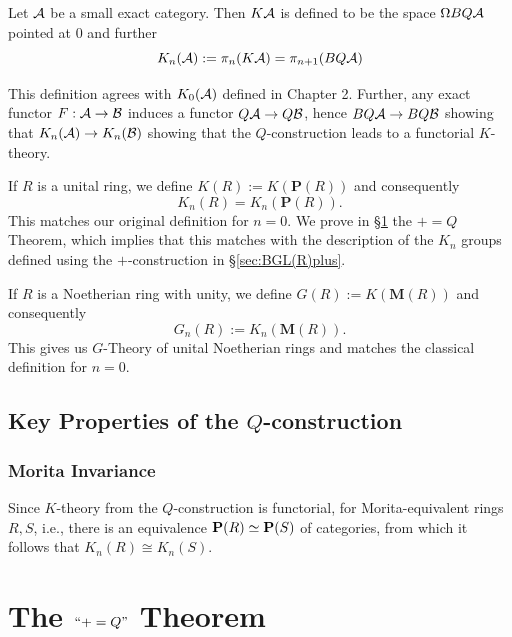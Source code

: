 \begin{definition}
Let $\mathcal{A}$ be a small exact category. Then $K\mathcal{A}$ is defined to be the space $\Omega BQ\mathcal{A}$ pointed at $0$
and further
\[
K_n(\mathcal{A}) := \pi_n(K\mathcal{A}) = \pi_{n+1}(BQ\mathcal{A})
\]
\end{definition}

This definition agrees with $K_0(\mathcal{A})$ defined in Chapter 2. Further, any exact functor $F : \mathcal{A} \to \mathcal{B}$
induces a functor $Q\mathcal{A} \to Q\mathcal{B}$, hence $BQ\mathcal{A} \to BQ\mathcal{B}$ showing that $K_n(\mathcal{A}) \to K_n(\mathcal{B})$
showing that the $Q$-construction leads to a functorial $K$-theory.

\begin{definition}
If $R$ is a unital ring,
we define $K(R) := K(\mathbf P(R))$ and consequently
\[K_n(R) = K_n(\mathbf P(R)).\]
This matches our original definition for $n = 0$.
We prove in \S\ref{sec:+=Q} the $+=Q$ Theorem, which implies that this matches with the description of the
$K_n$ groups defined using the $+$-construction in \S\ref{sec:BGL(R)plus}.
\end{definition}

\begin{definition}
If $R$ is a Noetherian ring with unity,
we define $G(R) := K(\mathbf M(R))$ and consequently
\[G_n(R) := K_n(\mathbf M(R)).\]
This gives us $G$-Theory of unital Noetherian rings and matches the classical definition for $n = 0$.
\end{definition}



\subsection{Key Properties of the $Q$-construction}

\subsubsection{Morita Invariance}
Since $K$-theory from the $Q$-construction is functorial,
for Morita-equivalent rings $R, S$, i.e., there is an equivalence $\mathbf P(R) \simeq \mathbf P(S)$
of categories, from which it follows that $K_n(R) \cong K_n(S)$.

\section{The $``+=Q"$ Theorem} \label{sec:+=Q}

